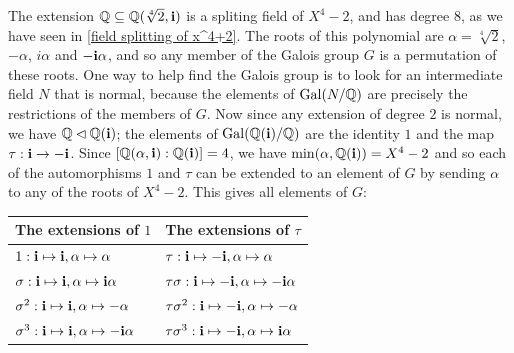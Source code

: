 \begin{example}
The extension $\mathbb{Q}\subseteq\mathbb{Q}(\sqrt[4]{2},\mathbf{i})$ is a spliting field of $X^4-2$, and has degree $8$, as we have seen in \cref{field splitting of x^4+2}. The roots of this polynomial are $\alpha=\sqrt[4]{2}$, $-\alpha$, $i\alpha$ and $-\mathbf{i}\alpha$, and so any member of the Galois group $G$ is a permutation of these roots. One way to help find the Galois group is to look for an intermediate field $N$ that is normal, because the elements of $\mathrm{Gal}(N/\mathbb{Q})$ are precisely the restrictions of the members of $G$. Now since any extension of degree $2$ is normal, we have $\mathbb{Q}\lhd\mathbb{Q}(\mathbf{i})$; the elements of $\mathrm{Gal}(\mathbb{Q}(\mathbf{i})/\mathbb{Q})$ are the identity $1$ and the map $\tau:\mathbf{i}\to-\mathbf{i}$. Since $[\mathbb{Q}(\alpha,\mathbf{i}):\mathbb{Q}(\mathbf{i})]=4$, we have $\min(\alpha,\mathbb{Q}(\mathbf{i}))=X^4-2$ and so each of the automorphisms $1$ and $\tau$ can be extended to an element of $G$ by sending $\alpha$ to any of the roots of $X^4-2$. This gives all elements of $G$:
\begin{table}[htbp]
\centering
\renewcommand\arraystretch{1.25}
\begin{tabular}{l|l}
\hline
The extensions of $1$& The extensions of $\tau$\\
\hline
$1:\mathbf{i}\mapsto \mathbf{i},\alpha\mapsto\alpha$&$\tau:\mathbf{i}\mapsto-\mathbf{i},\alpha\mapsto \alpha$\\
$\sigma:\mathbf{i}\mapsto \mathbf{i},\alpha\mapsto \mathbf{i}\alpha$&$\tau\sigma:\mathbf{i}\mapsto-\mathbf{i},\alpha\mapsto -\mathbf{i}\alpha$\\
$\sigma^2:\mathbf{i}\mapsto \mathbf{i},\alpha\mapsto-\alpha$&$\tau\sigma^2:\mathbf{i}\mapsto-\mathbf{i},\alpha\mapsto-\alpha$\\
$\sigma^3:\mathbf{i}\mapsto \mathbf{i},\alpha\mapsto-\mathbf{i}\alpha$&$\tau\sigma^3:\mathbf{i}\mapsto-\mathbf{i},\alpha\mapsto \mathbf{i}\alpha$\\
\hline
\end{tabular}
\end{table}


\end{example}
